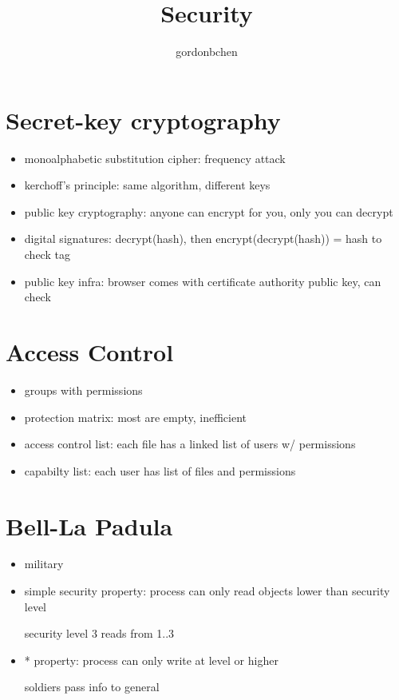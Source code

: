 \documentclass[11pt]{article}
\title{Security}
\author{gordonbchen}
\date{}
\begin{document}
\maketitle


\section{Secret-key cryptography}
\begin{itemize}
    \item monoalphabetic substitution cipher: frequency attack

    \item kerchoff's principle: same algorithm, different keys

    \item public key cryptography: anyone can encrypt for you, only you can decrypt

    \item digital signatures: decrypt(hash), then encrypt(decrypt(hash)) = hash to check tag

    \item public key infra: browser comes with certificate authority public key, can check
\end{itemize}


\section{Access Control}
\begin{itemize}
    \item groups with permissions
    \item protection matrix: most are empty, inefficient
    \item access control list: each file has a linked list of users w/ permissions
    \item capabilty list: each user has list of files and permissions
\end{itemize}


\section{Bell-La Padula}
\begin{itemize}
    \item military
    \item simple security property: process can only read objects lower than security level

        security level 3 reads from 1..3

    \item * property: process can only write at level or higher

        soldiers pass info to general 
\end{itemize}
\end{document}
